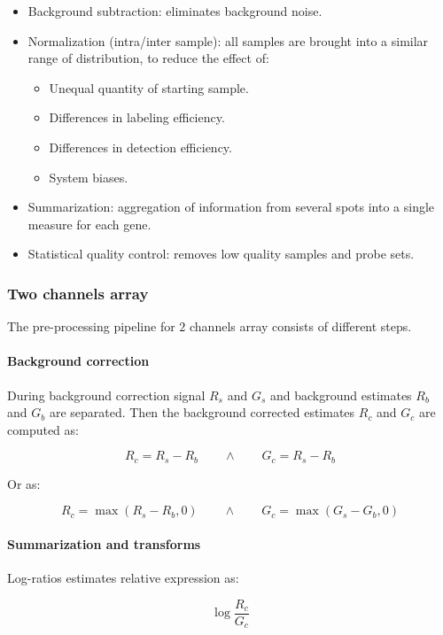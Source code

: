		\begin{itemize}
			\item Background subtraction: eliminates background noise.
			\item Normalization (intra/inter sample): all samples are brought into a similar range of distribution, to reduce the effect of:

				\begin{itemize}
					\item Unequal quantity of starting sample.
					\item Differences in labeling efficiency.
					\item Differences in detection efficiency.
					\item System biases.
				\end{itemize}

			\item Summarization: aggregation of information from several spots into a single measure for each gene.
			\item Statistical quality control: removes low quality samples and probe sets.

		\end{itemize}


		\subsubsection{Two channels array}
		The pre-processing pipeline for $2$ channels array consists of different steps.

			\paragraph{Background correction}
			During background correction signal $R_s$ and $G_s$ and background estimates $R_b$ and $G_b$ are separated.
			Then the background corrected estimates $R_c$ and $G_c$ are computed as:

			$$R_c = R_s-R_b\qquad\land\qquad G_c = R_s-R_b$$

			Or as:

			$$R_c = \max(R_s-R_b, 0)\qquad\land\qquad G_c = \max(G_s-G_b, 0)$$

			\paragraph{Summarization and transforms}
			Log-ratios estimates relative expression as:

			$$\log\frac{R_c}{G_c}$$

